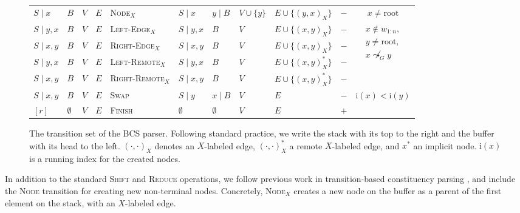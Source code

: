 \documentclass[11pt]{article}
\begin{document}
\begin{figure*}
\begin{adjustbox}{width=\textwidth,margin=3pt,frame}
\begin{tabular}{llll|l|llllc|c}
\cline{11-11}
$S \;|\; x$ & $B$ & $V$ & $E$ & \textsc{Node$_X$} & $S \;|\; x$ & $y \;|\; B$ & $V \cup \{ y \}$ & $E \cup \{ (y,x)_X \}$ & $-$ &
$x \neq \mathrm{root}$ \\
\cline{11-11}
\cline{11-11}
$S \;|\; y,x$ & $B$ & $V$ & $E$ & \textsc{Left-Edge$_X$} & $S \;|\; y,x$ & $B$ & $V$ & $E \cup \{ (x,y)_X \}$ & $-$ &
\multirow{4}{50pt}{$\begin{aligned}
x \not\in w_{1:n},\\
y \neq \mathrm{root},\\
x \not\leadsto_G y
\end{aligned}$} \\
$S \;|\; x,y$ & $B$ & $V$ & $E$ & \textsc{Right-Edge$_X$} & $S \;|\; x,y$ & $B$ & $V$ & $E \cup \{ (x,y)_X \}$ & $-$ & \\
$S \;|\; y,x$ & $B$ & $V$ & $E$ & \textsc{Left-Remote$_X$} & $S \;|\; y,x$ & $B$ & $V$ & $E \cup \{ (x,y)_X^* \}$ & $-$ & \\
$S \;|\; x,y$ & $B$ & $V$ & $E$ & \textsc{Right-Remote$_X$} & $S \;|\; x,y$ & $B$ & $V$ & $E \cup \{ (x,y)_X^* \}$ & $-$ & \\
\cline{11-11}
$S \;|\; x,y$ & $B$ & $V$ & $E$ & \textsc{Swap} & $S \;|\; y$ & $x \;|\; B$ & $V$ & $E$ & $-$ &
$\mathrm{i}(x) < \mathrm{i}(y)$ \\
\cline{11-11}
$[r]$ & $\emptyset$ & $V$ & $E$ & \textsc{Finish} & $\emptyset$ & $\emptyset$ & $V$ & $E$ & $+$ & \\
\end{tabular}
\end{adjustbox}
\caption{\label{fig:transitions}
  The transition set of the \textsc{BCS} parser. Following standard practice,
  we write the stack with its top to the right and the buffer with its head to the left.
  $(\cdot,\cdot)_X$ denotes an $X$-labeled edge, $(\cdot,\cdot)_X^*$ a remote $X$-labeled edge,
  and $x^*$ an implicit node. $\mathrm{i}(x)$ is a running index for the created nodes.
}
\end{figure*}

In addition to the standard \textsc{Shift} and \textsc{Reduce} operations, 
we follow previous work in transition-based constituency parsing \cite{zhu2013fast}, and include the \textsc{Node} transition for creating new non-terminal nodes.
Concretely, \textsc{Node$_X$} creates a new node on the buffer as a parent of the first element on the stack, with an $X$-labeled edge.
\end{document}
